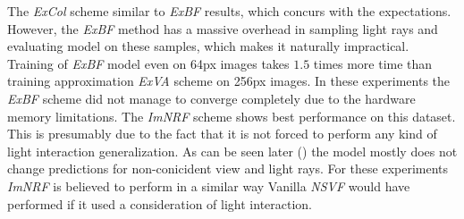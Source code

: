 The \textit{ExCol} scheme similar to \textit{ExBF} results,
which concurs with the expectations.
However, the \textit{ExBF} method has a massive overhead in sampling light rays
and evaluating model on these samples,
which makes it naturally impractical.
Training of \textit{ExBF} model even on 64px images takes $1.5$ times more time
than training approximation \textit{ExVA} scheme on 256px images.
In these experiments the \textit{ExBF} scheme did not manage
to converge completely due to the hardware memory limitations.
The \textit{ImNRF} scheme shows best performance on this dataset.
This is presumably due to the fact that it is not forced
to perform any kind of light interaction generalization.
As can be seen later () the model
mostly does not change predictions for non-conicident view and light rays.
For these experiments \textit{ImNRF} is believed to perform
in a similar way Vanilla \textit{NSVF} would have performed if it used a consideration of light interaction.






